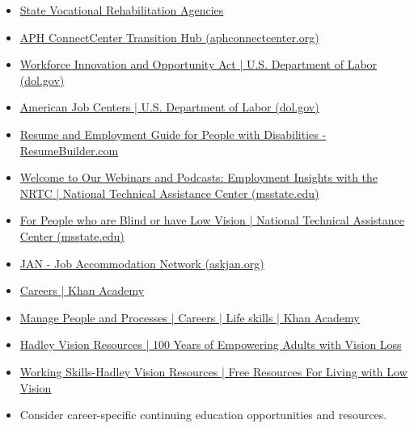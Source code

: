 \begin{itemize}[leftmargin=*]
\begin{itemize}
\item \href{https://nam11.safelinks.protection.outlook.com/?url=https%3A%2F%2Frsa.ed.gov%2Fabout%2Fstates&data=05%7C01%7Cchris_fendrick%40kernhigh.org%7Cbc7ebcd1034f4b8956c808da4e0886ed%7C79e9a47a04484925bf6638dadfc6f0a4%7C0%7C0%7C637908095803823825%7CUnknown%7CTWFpbGZsb3d8eyJWIjoiMC4wLjAwMDAiLCJQIjoiV2luMzIiLCJBTiI6Ik1haWwiLCJXVCI6Mn0%3D%7C3000%7C%7C%7C&sdata=7Yp0WqYpmUt23krj04UuAfM%2FfPtXDqngbOewfl9go10%3D&reserved=0}{State Vocational Rehabilitation Agencies}
\item \href{https://aphconnectcenter.org/TransitionHub/}{APH ConnectCenter Transition Hub (aphconnectcenter.org)}
\item \href{https://www.dol.gov/agencies/eta/wioa#main-content}{Workforce Innovation and Opportunity Act | U.S. Department of Labor (dol.gov)}
\item \href{https://www.dol.gov/general/topic/training/onestop#main-content}{American Job Centers | U.S. Department of Labor (dol.gov)}
\item \href{https://www.resumebuilder.com/comprehensive-resume-and-career-guide-for-people-with-disabilities/}{Resume and Employment Guide for People with Disabilities - ResumeBuilder.com}
\item \href{https://www.ntac.blind.msstate.edu/consumers/webinars-podcasts}{Welcome to Our Webinars and Podcasts: Employment Insights with the NRTC | National Technical Assistance Center (msstate.edu)}
\item \href{https://www.ntac.blind.msstate.edu/consumers}{For People who are Blind or have Low Vision | National Technical Assistance Center (msstate.edu)}
\item \href{https://askjan.org/}{JAN - Job Accommodation Network (askjan.org)}
\item \href{https://www.khanacademy.org/search?referer=%2F&page_search_query=careers}{Careers | Khan Academy}
\item \href{https://www.khanacademy.org/college-careers-more/career-content/manage-people-and-processes#main-content}{Manage People and Processes | Careers | Life skills | Khan Academy}
\item \href{https://hadley.edu/}{Hadley Vision Resources | 100 Years of Empowering Adults with Vision Loss}
\item \href{https://hadley.edu/learn#main-content?topic_id=16}{Working Skills-Hadley Vision Resources | Free Resources For Living with Low Vision}
\item Consider career-specific continuing education opportunities and resources.

\end{itemize}
\end{itemize}

